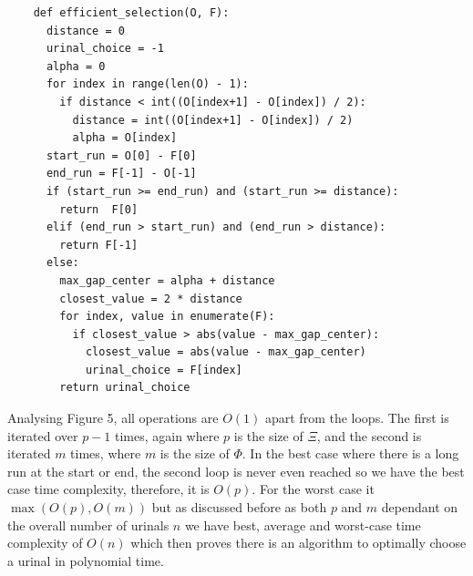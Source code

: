 \documentclass{article}
\begin{document}
\begin{center}
    \begin{lstlisting}
    def efficient_selection(O, F):
      distance = 0
      urinal_choice = -1
      alpha = 0
      for index in range(len(O) - 1):
        if distance < int((O[index+1] - O[index]) / 2):
          distance = int((O[index+1] - O[index]) / 2)
          alpha = O[index]
      start_run = O[0] - F[0]
      end_run = F[-1] - O[-1]
      if (start_run >= end_run) and (start_run >= distance):
        return  F[0]
      elif (end_run > start_run) and (end_run > distance):
        return F[-1]
      else:
        max_gap_center = alpha + distance
        closest_value = 2 * distance
        for index, value in enumerate(F):
          if closest_value > abs(value - max_gap_center):
            closest_value = abs(value - max_gap_center)
            urinal_choice = F[index]
        return urinal_choice
    \end{lstlisting}
\end{center}
Analysing Figure 5, all operations are $O(1)$ apart from the loops. The first is iterated over $p-1$ times, again where $p$ is the size of $\Xi$, and the second is iterated $m$ times, where $m$ is the size of $\Phi$. In the best case where there is a long run at the start or end, the second loop is never even reached so we have the best case time complexity, therefore, it is $O(p)$. For the worst case it $\max(O(p), O(m))$ but as discussed before as both $p$ and $m$ dependant on the overall number of urinals $n$ we have best, average and worst-case time complexity of $O(n)$ which then proves there is an algorithm to optimally choose a urinal in polynomial time.
\end{document}
